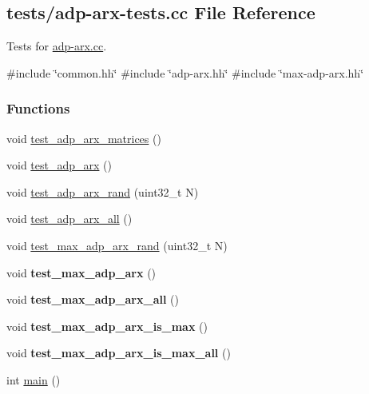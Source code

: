 \hypertarget{adp-arx-tests_8cc}{\subsection{tests/adp-\/arx-\/tests.cc \-File \-Reference}
\label{adp-arx-tests_8cc}
}


\-Tests for \hyperlink{adp-arx_8cc}{adp-\/arx.\-cc}.  


{\ttfamily \#include \char`\"{}common.\-hh\char`\"{}}\*
{\ttfamily \#include \char`\"{}adp-\/arx.\-hh\char`\"{}}\*
{\ttfamily \#include \char`\"{}max-\/adp-\/arx.\-hh\char`\"{}}\*
\subsubsection*{\-Functions}
\begin{DoxyCompactItemize}
\item 
void \hyperlink{adp-arx-tests_8cc_a06e002a91278f9a992a9bc8daaefc915}{test\-\_\-adp\-\_\-arx\-\_\-matrices} ()
\item 
void \hyperlink{adp-arx-tests_8cc_aa67d082b3ff063f336c588e6c2ca0db1}{test\-\_\-adp\-\_\-arx} ()
\item 
void \hyperlink{adp-arx-tests_8cc_a7e4a80024c9804fd705205e49a6c4995}{test\-\_\-adp\-\_\-arx\-\_\-rand} (uint32\-\_\-t \-N)
\item 
void \hyperlink{adp-arx-tests_8cc_a57007bbac454bd8ee1dad4837f1e154a}{test\-\_\-adp\-\_\-arx\-\_\-all} ()
\item 
void \hyperlink{adp-arx-tests_8cc_a7b2047dee4f0a429e28c5a8347f7cb88}{test\-\_\-max\-\_\-adp\-\_\-arx\-\_\-rand} (uint32\-\_\-t \-N)
\item 
\hypertarget{adp-arx-tests_8cc_aab353c14a25e98065ea10130fbb2b4df}{void {\bfseries test\-\_\-max\-\_\-adp\-\_\-arx} ()}\label{adp-arx-tests_8cc_aab353c14a25e98065ea10130fbb2b4df}

\item 
\hypertarget{adp-arx-tests_8cc_a754c203c83a9f72718c8a60a2be961e2}{void {\bfseries test\-\_\-max\-\_\-adp\-\_\-arx\-\_\-all} ()}\label{adp-arx-tests_8cc_a754c203c83a9f72718c8a60a2be961e2}

\item 
\hypertarget{adp-arx-tests_8cc_ad15741526fa487201c20c82dc7c21f3f}{void {\bfseries test\-\_\-max\-\_\-adp\-\_\-arx\-\_\-is\-\_\-max} ()}\label{adp-arx-tests_8cc_ad15741526fa487201c20c82dc7c21f3f}

\item 
\hypertarget{adp-arx-tests_8cc_a7c8b904d3b0cd230799329c82bc8ae67}{void {\bfseries test\-\_\-max\-\_\-adp\-\_\-arx\-\_\-is\-\_\-max\-\_\-all} ()}\label{adp-arx-tests_8cc_a7c8b904d3b0cd230799329c82bc8ae67}

\item 
int \hyperlink{adp-arx-tests_8cc_ae66f6b31b5ad750f1fe042a706a4e3d4}{main} ()
\end{DoxyCompactItemize}


